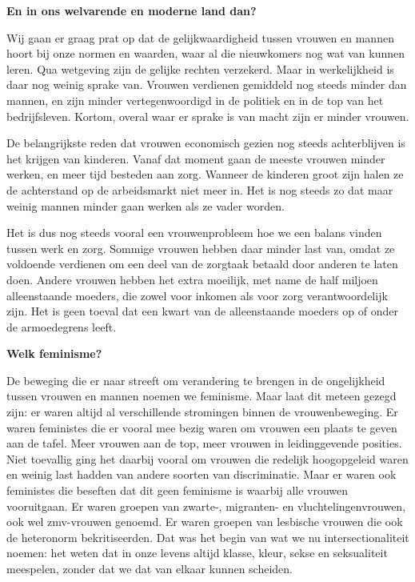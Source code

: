 \textbf{En in ons welvarende en moderne land dan?}

Wij gaan er graag prat op dat de gelijkwaardigheid tussen vrouwen en
mannen hoort bij onze normen en waarden, waar al die nieuwkomers nog wat
van kunnen leren. Qua wetgeving zijn de gelijke rechten verzekerd. Maar
in werkelijkheid is daar nog weinig sprake van. Vrouwen verdienen
gemiddeld nog steeds minder dan mannen, en zijn minder vertegenwoordigd
in de politiek en in de top van het bedrijfsleven. Kortom, overal waar
er sprake is van macht zijn er minder vrouwen.

De belangrijkste reden dat vrouwen economisch gezien nog steeds
achterblijven is het krijgen van kinderen. Vanaf dat moment gaan de
meeste vrouwen minder werken, en meer tijd besteden aan zorg. Wanneer de
kinderen groot zijn halen ze de achterstand op de arbeidsmarkt niet meer
in. Het is nog steeds zo dat maar weinig mannen minder gaan werken als
ze vader worden.

Het is dus nog steeds vooral een vrouwenprobleem hoe we een balans
vinden tussen werk en zorg. Sommige vrouwen hebben daar minder last van,
omdat ze voldoende verdienen om een deel van de zorgtaak betaald door
anderen te laten doen. Andere vrouwen hebben het extra moeilijk, met
name de half miljoen alleenstaande moeders, die zowel voor inkomen als
voor zorg verantwoordelijk zijn. Het is geen toeval dat een kwart van de
alleenstaande moeders op of onder de armoedegrens leeft.

\textbf{Welk feminisme?}

De beweging die er naar streeft om verandering te brengen in de
ongelijkheid tussen vrouwen en mannen noemen we feminisme. Maar laat dit
meteen gezegd zijn: er waren altijd al verschillende stromingen binnen
de vrouwenbeweging. Er waren feministes die er vooral mee bezig waren om
vrouwen een plaats te geven aan de tafel. Meer vrouwen aan de top, meer
vrouwen in leidinggevende posities. Niet toevallig ging het daarbij
vooral om vrouwen die redelijk hoogopgeleid waren en weinig last hadden
van andere soorten van discriminatie. Maar er waren ook feministes die
beseften dat dit geen feminisme is waarbij alle vrouwen vooruitgaan. Er
waren groepen van zwarte-, migranten- en vluchtelingenvrouwen, ook wel
zmv-vrouwen genoemd. Er waren groepen van lesbische vrouwen die ook de
heteronorm bekritiseerden. Dat was het begin van wat we nu
intersectionaliteit noemen: het weten dat in onze levens altijd klasse,
kleur, sekse en seksualiteit meespelen, zonder dat we dat van elkaar
kunnen scheiden.

